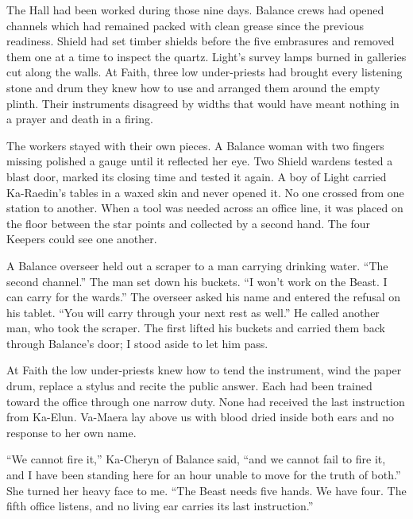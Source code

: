 The Hall had been worked during those nine days. Balance crews had opened channels which had remained packed with clean grease since the previous readiness. Shield had set timber shields before the five embrasures and removed them one at a time to inspect the quartz. Light's survey lamps burned in galleries cut along the walls. At Faith, three low under-priests had brought every listening stone and drum they knew how to use and arranged them around the empty plinth. Their instruments disagreed by widths that would have meant nothing in a prayer and death in a firing.\par

The workers stayed with their own pieces. A Balance woman with two fingers missing polished a gauge until it reflected her eye. Two Shield wardens tested a blast door, marked its closing time and tested it again. A boy of Light carried Ka-Raedin's tables in a waxed skin and never opened it. No one crossed from one station to another. When a tool was needed across an office line, it was placed on the floor between the star points and collected by a second hand. The four Keepers could see one another.\par

A Balance overseer held out a scraper to a man carrying drinking water. ``The second channel.'' The man set down his buckets. ``I won't work on the Beast. I can carry for the wards.'' The overseer asked his name and entered the refusal on his tablet. ``You will carry through your next rest as well.'' He called another man, who took the scraper. The first lifted his buckets and carried them back through Balance's door; I stood aside to let him pass.\par

At Faith the low under-priests knew how to tend the instrument, wind the paper drum, replace a stylus and recite the public answer. Each had been trained toward the office through one narrow duty. None had received the last instruction from Ka-Elun. Va-Maera lay above us with blood dried inside both ears and no response to her own name.\par

``We cannot fire it,'' Ka-Cheryn of Balance said, ``and we cannot fail to fire it, and I have been standing here for an hour unable to move for the truth of both.'' She turned her heavy face to me. ``The Beast needs five hands. We have four. The fifth office listens, and no living ear carries its last instruction.''\par

